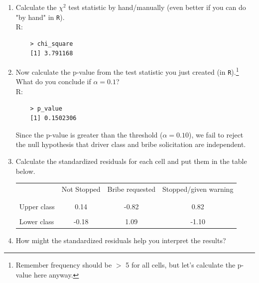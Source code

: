 \documentclass[12pt,letterpaper]{article}
\begin{document}
\begin{enumerate}
	
	\item [(a)]
	Calculate the $\chi^2$ test statistic by hand/manually (even better if you can do "by hand" in \texttt{R}).\\
	R:
	
	\begin{verbatim}
	> chi_square
	[1] 3.791168
	\end{verbatim}

	\vspace{0.5cm}
	
	\item [(b)]
	Now calculate the p-value from the test statistic you just created (in \texttt{R}).\footnote{Remember frequency should be $>$ 5 for all cells, but let's calculate the p-value here anyway.}  What do you conclude if $\alpha = 0.1$?\\
	R:
	
	\begin{verbatim}
	> p_value
	[1] 0.1502306
	\end{verbatim}
		Since the p-value is greater than the threshold ($\alpha = 0.10$), we fail to reject the null hypothesis that driver class and bribe solicitation are independent.
	\newpage
	\item [(c)] Calculate the standardized residuals for each cell and put them in the table below.
	\vspace{1cm}
	
	\begin{table}[h]
		\centering
		\begin{tabular}{l | c c c }
			& Not Stopped & Bribe requested & Stopped/given warning \\
			\\[-1.8ex] 
			\hline \\[-1.8ex]
			Upper class  & 0.14 & -0.82 & 0.82 \\
			\\
			Lower class & -0.18 & 1.09  & -1.10  \\
		\end{tabular}
	\end{table}
	
	
	\vspace{1cm}
	\item [(d)] How might the standardized residuals help you interpret the results?  \\
	

\end{enumerate}
\end{document}
